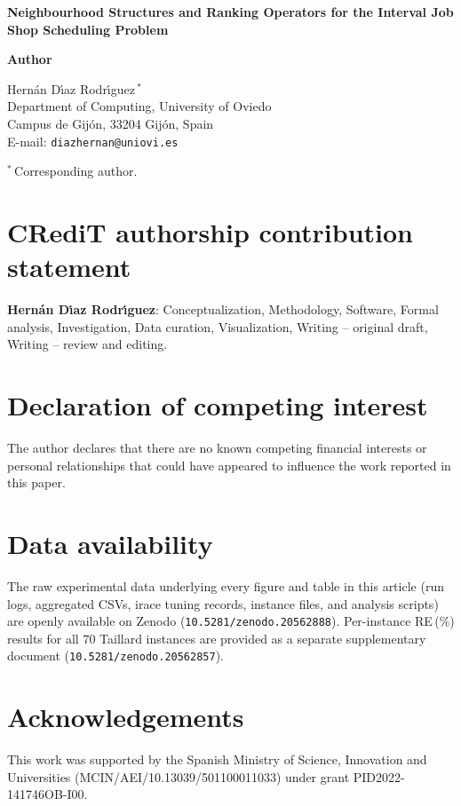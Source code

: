 \documentclass[11pt,a4paper]{article}
\begin{document}
\begin{center}
{\Large\bfseries Neighbourhood Structures and Ranking Operators for the
Interval Job Shop Scheduling Problem}
\end{center}

\bigskip

\noindent\textbf{Author}

\medskip

\noindent Hern\'an D\'{\i}az Rodr\'{\i}guez\,$^{*}$\\
Department of Computing, University of Oviedo\\
Campus de Gij\'on, 33204 Gij\'on, Spain\\
E-mail: \texttt{diazhernan@uniovi.es}

\medskip

\noindent$^{*}$\,Corresponding author.

\bigskip

\section*{CRediT authorship contribution statement}

\textbf{Hern\'an D\'{\i}az Rodr\'{\i}guez}: Conceptualization, Methodology,
Software, Formal analysis, Investigation, Data curation, Visualization,
Writing -- original draft, Writing -- review and editing.

\section*{Declaration of competing interest}

The author declares that there are no known competing financial interests or
personal relationships that could have appeared to influence the work
reported in this paper.

\section*{Data availability}

The raw experimental data underlying every figure and table in this article
(run logs, aggregated CSVs, irace tuning records, instance files, and analysis
scripts) are openly available on Zenodo (\texttt{10.5281/zenodo.20562888}).
Per-instance RE\,(\%) results for all 70 Taillard instances are provided as a
separate supplementary document (\texttt{10.5281/zenodo.20562857}).

\section*{Acknowledgements}

This work was supported by the Spanish Ministry of Science, Innovation and
Universities (MCIN/AEI/10.13039/501100011033) under grant
PID2022-141746OB-I00.
\end{document}
